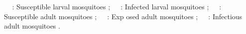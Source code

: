  𝑆𝑎: Susceptible larval mosquitoes  ;
 𝐼𝑎: Infected larval mosquitoes  ;
 𝑆𝑣: Susceptible adult mosquitoes ;
 𝐸𝑣: Exp osed adult mosquitoes ;
 𝐼𝑣: Infectious adult mosquitoes .